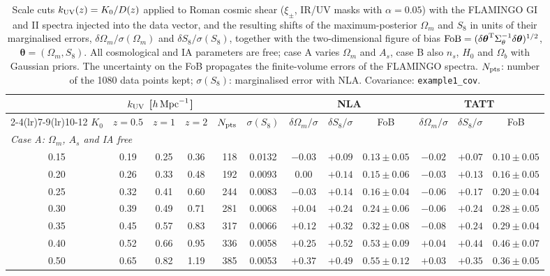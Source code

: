 \begin{table}
\centering
\caption{Scale cuts $k_{\rm UV}(z) = K_0/D(z)$ applied to Roman cosmic shear ($\xi_\pm$, IR/UV masks with $\alpha = 0.05$) with the FLAMINGO GI and II spectra injected into the data vector, and the resulting shifts of the maximum-posterior $\Omega_m$ and $S_8$ in units of their marginalised errors, $\delta\Omega_m/\sigma(\Omega_m)$ and $\delta S_8/\sigma(S_8)$, together with the two-dimensional figure of bias $\mathrm{FoB} = (\delta\boldsymbol{\theta}^{\rm T}\Sigma_\theta^{-1}\delta\boldsymbol{\theta})^{1/2}$, $\boldsymbol{\theta} = (\Omega_m, S_8)$. All cosmological and IA parameters are free; case A varies $\Omega_m$ and $A_s$, case B also $n_s$, $H_0$ and $\Omega_b$ with Gaussian priors. The uncertainty on the FoB propagates the finite-volume errors of the FLAMINGO spectra. $N_{\rm pts}$: number of the 1080 data points kept; $\sigma(S_8)$: marginalised error with NLA. Covariance: \texttt{example1\_cov}.}
\label{tab:k0D_fob}
\begin{tabular}{c ccc r c ccc ccc}
\toprule
 & \multicolumn{3}{c}{$k_{\rm UV}$ [$h\,{\rm Mpc}^{-1}$]} & & & \multicolumn{3}{c}{NLA} & \multicolumn{3}{c}{TATT}\\
\cmidrule(lr){2-4}\cmidrule(lr){7-9}\cmidrule(lr){10-12}
$K_0$ & $z=0.5$ & $z=1$ & $z=2$ & $N_{\rm pts}$ & $\sigma(S_8)$ & $\delta\Omega_m/\sigma$ & $\delta S_8/\sigma$ & FoB & $\delta\Omega_m/\sigma$ & $\delta S_8/\sigma$ & FoB\\
\midrule
\multicolumn{12}{l}{\emph{Case A: $\Omega_m$, $A_s$ and IA free}}\\
0.15 & 0.19 & 0.25 & 0.36 & 118 & 0.0132 & $-0.03$ & $+0.09$ & $0.13\pm0.05$ & $-0.02$ & $+0.07$ & $0.10\pm0.05$\\
0.20 & 0.26 & 0.33 & 0.48 & 192 & 0.0093 & $0.00$ & $+0.14$ & $0.15\pm0.06$ & $-0.03$ & $+0.13$ & $0.16\pm0.05$\\
0.25 & 0.32 & 0.41 & 0.60 & 244 & 0.0083 & $-0.03$ & $+0.14$ & $0.16\pm0.04$ & $-0.06$ & $+0.17$ & $0.20\pm0.04$\\
0.30 & 0.39 & 0.49 & 0.71 & 281 & 0.0068 & $+0.04$ & $+0.24$ & $0.24\pm0.06$ & $-0.06$ & $+0.24$ & $0.28\pm0.05$\\
0.35 & 0.45 & 0.57 & 0.83 & 317 & 0.0066 & $+0.12$ & $+0.32$ & $0.32\pm0.08$ & $-0.08$ & $+0.24$ & $0.29\pm0.04$\\
0.40 & 0.52 & 0.66 & 0.95 & 336 & 0.0058 & $+0.25$ & $+0.52$ & $0.53\pm0.09$ & $+0.04$ & $+0.44$ & $0.46\pm0.07$\\
0.50 & 0.65 & 0.82 & 1.19 & 385 & 0.0053 & $+0.37$ & $+0.49$ & $0.55\pm0.12$ & $+0.03$ & $+0.35$ & $0.36\pm0.05$\\

\end{tabular}
\end{table}
